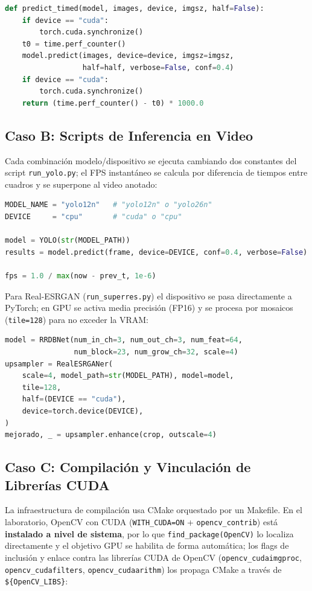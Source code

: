 \begin{lstlisting}[style=code, language=Python]
def predict_timed(model, images, device, imgsz, half=False):
    if device == "cuda":
        torch.cuda.synchronize()
    t0 = time.perf_counter()
    model.predict(images, device=device, imgsz=imgsz,
                  half=half, verbose=False, conf=0.4)
    if device == "cuda":
        torch.cuda.synchronize()
    return (time.perf_counter() - t0) * 1000.0
\end{lstlisting}

\subsection{Caso B: Scripts de Inferencia en Video}

Cada combinación modelo/dispositivo se ejecuta cambiando dos constantes del
script \texttt{run\_yolo.py}; el FPS instantáneo se calcula por diferencia de
tiempos entre cuadros y se superpone al video anotado:

\begin{lstlisting}[style=code, language=Python]
MODEL_NAME = "yolo12n"   # "yolo12n" o "yolo26n"
DEVICE     = "cpu"       # "cuda" o "cpu"

model = YOLO(str(MODEL_PATH))
results = model.predict(frame, device=DEVICE, conf=0.4, verbose=False)

fps = 1.0 / max(now - prev_t, 1e-6)
\end{lstlisting}

Para Real-ESRGAN (\texttt{run\_superres.py}) el dispositivo se pasa
directamente a PyTorch; en GPU se activa media precisión (FP16) y se procesa
por mosaicos (\texttt{tile=128}) para no exceder la VRAM:

\begin{lstlisting}[style=code, language=Python]
model = RRDBNet(num_in_ch=3, num_out_ch=3, num_feat=64,
                num_block=23, num_grow_ch=32, scale=4)
upsampler = RealESRGANer(
    scale=4, model_path=str(MODEL_PATH), model=model,
    tile=128,
    half=(DEVICE == "cuda"),
    device=torch.device(DEVICE),
)
mejorado, _ = upsampler.enhance(crop, outscale=4)
\end{lstlisting}

\subsection{Caso C: Compilación y Vinculación de Librerías CUDA}

La infraestructura de compilación usa CMake orquestado por un Makefile. En el
laboratorio, OpenCV con CUDA (\texttt{WITH\_CUDA=ON} + \texttt{opencv\_contrib})
está \textbf{instalado a nivel de sistema}, por lo que
\texttt{find\_package(OpenCV)} lo localiza directamente y el objetivo GPU se
habilita de forma automática; los flags de inclusión y enlace contra las
librerías CUDA de OpenCV (\texttt{opencv\_cudaimgproc},
\texttt{opencv\_cudafilters}, \texttt{opencv\_cudaarithm}) los propaga CMake a
través de \texttt{\$\{OpenCV\_LIBS\}}:


